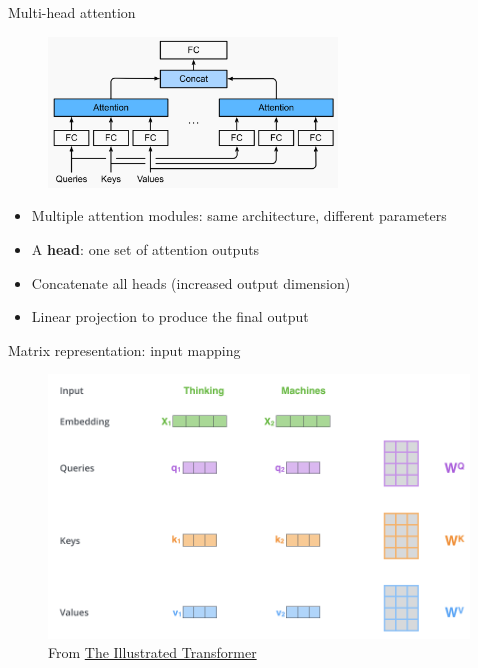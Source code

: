 \documentclass[usenames,dvipsnames,notes,11pt,aspectratio=169,hyperref={colorlinks=true, linkcolor=blue}]{beamer}
\begin{document}
\begin{frame}
    {Multi-head attention}
    \begin{figure}
        \includegraphics[height=4cm]{figures/multihead}
    \end{figure}
    \begin{itemize}
        \item Multiple attention modules: same architecture, different parameters
            \pause
        \item A \textbf{head}: one set of attention outputs
            \pause
        \item Concatenate all heads (increased output dimension)
        \item Linear projection to produce the final output
    \end{itemize}
\end{frame}

\begin{frame}
    {Matrix representation: input mapping}
    \begin{figure}
        \includegraphics[height=7cm]{figures/self-attn-matrix.png}
        \caption{From \href{https://jalammar.github.io/illustrated-transformer}{The Illustrated Transformer}}
    \end{figure}
\end{frame}
\end{document}

